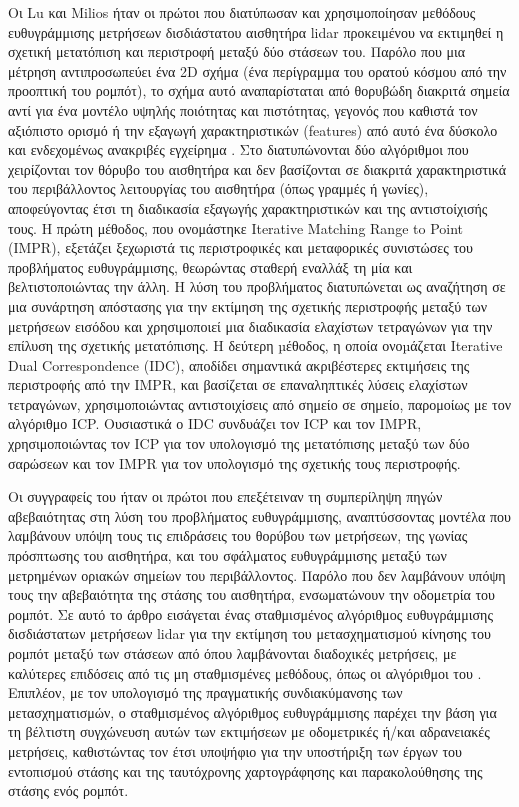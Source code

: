 Οι Lu και Milios ήταν οι πρώτοι που διατύπωσαν και χρησιμοποίησαν μεθόδους
ευθυγράμμισης μετρήσεων δισδιάστατου αισθητήρα lidar προκειμένου να εκτιμηθεί η
σχετική μετατόπιση και περιστροφή μεταξύ δύο στάσεων του. Παρόλο που μια
μέτρηση αντιπροσωπεύει ένα 2D σχήμα (ένα περίγραμμα του ορατού κόσμου από την
προοπτική του ρομπότ), το σχήμα αυτό αναπαρίσταται από θορυβώδη διακριτά σημεία
αντί για ένα μοντέλο υψηλής ποιότητας και πιστότητας, γεγονός που καθιστά τον
αξιόπιστο ορισμό ή την εξαγωγή χαρακτηριστικών (features) από αυτό ένα δύσκολο
και ενδεχομένως ανακριβές εγχείρημα \cite{Grimson}. Στο \cite{FengLu1994a}
διατυπώνονται δύο αλγόριθμοι που χειρίζονται τον θόρυβο του αισθητήρα και δεν
βασίζονται σε διακριτά χαρακτηριστικά του περιβάλλοντος λειτουργίας του
αισθητήρα (όπως γραμμές ή γωνίες), αποφεύγοντας έτσι τη διαδικασία εξαγωγής
χαρακτηριστικών και της αντιστοίχισής τους. Η πρώτη μέθοδος, που ονομάστηκε
Iterative Matching Range to Point (IMPR), εξετάζει ξεχωριστά τις περιστροφικές
και μεταφορικές συνιστώσες του προβλήματος ευθυγράμμισης, θεωρώντας σταθερή
εναλλάξ τη μία και βελτιστοποιώντας την άλλη. Η λύση του προβλήματος
διατυπώνεται ως αναζήτηση σε μια συνάρτηση απόστασης για την εκτίμηση της
σχετικής περιστροφής μεταξύ των μετρήσεων εισόδου και χρησιμοποιεί μια
διαδικασία ελαχίστων τετραγώνων για την επίλυση της σχετικής μετατόπισης. Η
δεύτερη µέθοδος, η οποία ονοµάζεται Iterative Dual Correspondence (IDC),
αποδίδει σημαντικά ακριβέστερες εκτιμήσεις της περιστροφής από την IMPR, και
βασίζεται σε επαναληπτικές λύσεις ελαχίστων τετραγώνων, χρησιμοποιώντας
αντιστοιχίσεις από σημείο σε σημείο, παρομοίως με τον αλγόριθμο ICP. Ουσιαστικά
ο IDC συνδυάζει τον ICP και τον IMPR, χρησιμοποιώντας τον ICP για τον υπολογισμό
της μετατόπισης μεταξύ των δύο σαρώσεων και τον IMPR για τον υπολογισμό της
σχετικής τους περιστροφής.

Οι συγγραφείς του \cite{Pfistera} ήταν οι πρώτοι που επεξέτειναν τη συμπερίληψη
πηγών αβεβαιότητας στη λύση του προβλήματος ευθυγράμμισης, αναπτύσσοντας
μοντέλα που λαμβάνουν υπόψη τους τις επιδράσεις του θορύβου των μετρήσεων, της
γωνίας πρόσπτωσης του αισθητήρα, και του σφάλματος ευθυγράμμισης μεταξύ των
μετρημένων οριακών σημείων του περιβάλλοντος. Παρόλο που δεν λαμβάνουν υπόψη
τους την αβεβαιότητα της στάσης του αισθητήρα, ενσωματώνουν την οδομετρία του
ρομπότ. Σε αυτό το άρθρο εισάγεται ένας σταθμισμένος αλγόριθμος ευθυγράμμισης
δισδιάστατων μετρήσεων lidar για την εκτίμηση του μετασχηματισμού
κίνησης του ρομπότ μεταξύ των στάσεων από όπου λαμβάνονται διαδοχικές
μετρήσεις, με καλύτερες επιδόσεις από τις μη σταθμισμένες μεθόδους, όπως οι
αλγόριθμοι του \cite{FengLu1994a}.  Επιπλέον, με τον υπολογισμό της πραγματικής
συνδιακύμανσης των μετασχηματισμών, ο σταθμισμένος αλγόριθμος ευθυγράμμισης
παρέχει την βάση για τη βέλτιστη συγχώνευση αυτών των εκτιμήσεων με οδομετρικές
ή/και αδρανειακές μετρήσεις, καθιστώντας τον έτσι υποψήφιο για την υποστήριξη
των έργων του εντοπισμού στάσης και της ταυτόχρονης χαρτογράφησης και
παρακολούθησης της στάσης ενός ρομπότ.

